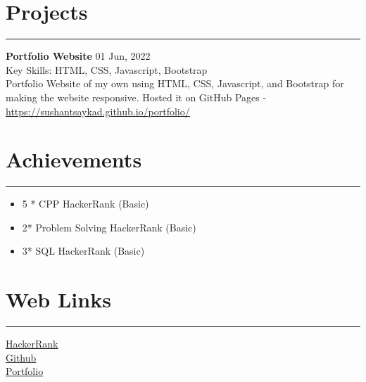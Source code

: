 \documentclass[a4paper,11pt]{article}
\begin{document}
\section*{Projects}
\vspace{-0.2cm}
\hrule
\vspace{0.2cm}
\textbf{Portfolio Website} \hfill 01 Jun, 2022\\
Key Skills: HTML, CSS, Javascript, Bootstrap\\
Portfolio Website of my own using HTML, CSS, Javascript, and Bootstrap for making the website responsive. Hosted it on GitHub Pages - \href{https://sushantsaykad.github.io/portfolio/}{https://sushantsaykad.github.io/portfolio/}

\section*{Achievements}
\vspace{-0.2cm}
\hrule
\vspace{0.2cm}
\begin{itemize}
    \item 5 * CPP HackerRank (Basic)
    \item 2* Problem Solving HackerRank (Basic)
    \item 3* SQL HackerRank (Basic)
\end{itemize}

\section*{Web Links}
\vspace{-0.2cm}
\hrule
\vspace{0.2cm}
\href{https://www.hackerrank.com/sushant_saykad}{HackerRank}\\
\href{https://github.com/SushantSaykad}{Github}\\
\href{https://sushantsaykad.github.io/portfolio/}{Portfolio}
\end{document}
